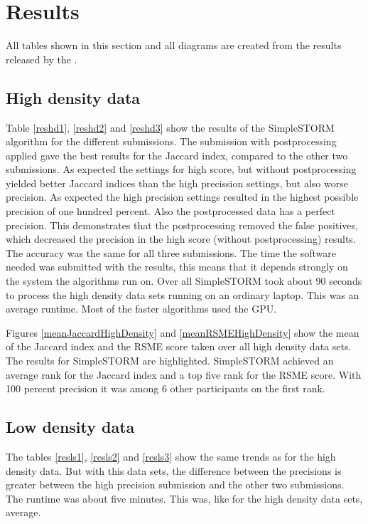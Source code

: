 \section{Results}
All tables shown in this section and all diagrams are created from the results released by the \cite{challenge}.
\subsection{High density data}
Table \ref{reshd1}, \ref{reshd2} and \ref{reshd3} show the results of the SimpleSTORM algorithm for the different submissions. The submission with postprocessing applied gave the best results for the Jaccard index, compared to the other two submissions. As expected the settings for high score, but without postprocessing yielded better Jaccard indices than the high precission settings, but also worse precision. As expected the high precision settings resulted in the highest possible precision of one hundred percent. Also the postprocessed data has a perfect precision. This demonstrates that the postprocessing removed the false positives, which decreased the precision in the high score (without postprocessing) results. The accuracy was the same for all three submissions.\newline
The time the software needed was submitted with the results, this means that it depends strongly on the system the algorithms run on. Over all SimpleSTORM took about 90 seconds to process the high density data sets running on an ordinary laptop. This was an average runtime. Most of the faster algorithms used the GPU.

Figures \ref{meanJaccardHighDensity} and \ref{meanRSMEHighDensity} show the mean of the Jaccard index and the RSME score taken over all high density data sets. The results for SimpleSTORM are highlighted. SimpleSTORM achieved an average rank for the Jaccard index and a top five rank for the RSME score. With 100 percent precision it was among 6 other participants on the first rank.




\subsection{Low density data}
The tables \ref{resls1}, \ref{resls2} and \ref{resls3} show the same trends as for the high density data. But with this data sets, the difference between the precisions is greater between the high precision submission and the other two submissions. The runtime was about five minutes. This was, like for the high density data sets, average.




